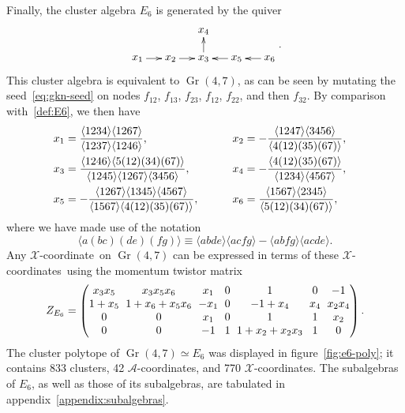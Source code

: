 \documentclass[12pt]{article}
\DeclareMathOperator{\Gr}{Gr}
\def\ket#1{\langle #1 \rangle}
\def\xcoord{$\mathcal{X}$-coordinate}
\def\xcoords{$\mathcal{X}$-coordinates}
\def\acoords{$\mathcal{A}$-coordinates}
\begin{document}
Finally, the cluster algebra $E_6$ is generated by the quiver
\begin{equation}\label{def:E6}
    \begin{gathered}
    \begin{xy} 0;<1pt,0pt>:<0pt,-1pt>::
      (0,0) *+{x_1} ="1",
      (30,0) *+{x_2} ="2",
      (60,0) *+{x_3} ="3",
      (60,-25) *+{x_4} ="4",
      (90,0) *+{x_5} ="5",
      (120,0) *+{x_6} ="6",
      "1", {\ar"2"},
      "2", {\ar"3"},
      "3", {\ar"4"},
      "5", {\ar"3"},
      "6", {\ar"5"},
    \end{xy}
    \end{gathered} .
\end{equation}
This cluster algebra is equivalent to $\Gr(4,7)$, as can be seen by mutating the seed~\eqref{eq:gkn-seed} on nodes $f_{12}$, $f_{13}$, $f_{23}$, $f_{12}$, $f_{22}$, and then $f_{32}$. By comparison with~\eqref{def:E6}, we then have 
\begin{align} \label{eq:E6_x_def}
x_1 &= \frac{\ket{1234}\ket{1267}}{\ket{1237} \ket{1246}}, \hspace{13.03ex} \quad \quad 
x_2 = - \frac{\ket{1247} \ket{3456}}{\ket{4(12)(35)(67)}}, \quad \nonumber \\
x_3 &= \frac{\ket{1246} \ket{5(12)(34)(67)}}{\ket{1245} \ket{1267} \ket{3456}}, \hspace{4.12ex} \quad \quad 
x_4 = -\frac{\ket{4(12)(35)(67)}}{\ket{1234} \ket{4567}}, \quad \\
x_5 &= -\frac{\ket{1267} \ket{1345}\ket{4567}}{\ket{1567}\ket{4(12)(35)(67)}}, \quad \quad \quad 
x_6 = \frac{\ket{1567}\ket{2345}}{\ket{5(12)(34)(67)}}, \quad \nonumber
\end{align}
where we have made use of the notation
\begin{equation} \label{eq:twistor_intersection}
\ket{a(bc)(de)(fg)} \equiv \ket{abde}\ket{acfg}-\ket{abfg}\ket{acde}.
\end{equation}
Any \xcoord\ on $\Gr(4,7)$ can be expressed in terms of these \xcoords\ using the momentum twistor matrix 
\begin{equation}
Z_{E_6} = 
\begingroup
\setlength\arraycolsep{3pt}
\begin{pmatrix} 
 x_3 x_5 & x_3 x_5 x_6 & x_1 & 0 & 1 & 0 & -1 \\
 1+x_5 & 1 + x_6 + x_5 x_6 & -x_1 & 0 & -1+x_4 & x_4 & x_2 x_4 \\
 0 & 0 & x_1 & 0 & 1 & 1 & x_2 \\
 0 & 0 & -1 & 1 & 1+x_2+x_2 x_3 & 1 & 0 \\
\end{pmatrix} .
\endgroup
\end{equation}
The cluster polytope of $\Gr(4,7) \simeq E_6$ was displayed in figure~\ref{fig:e6-poly}; it contains 833 clusters, 42 \acoords, and 770 \xcoords. The subalgebras of $E_6$, as well as those of its subalgebras, are tabulated in appendix~\ref{appendix:subalgebras}.
\end{document}

